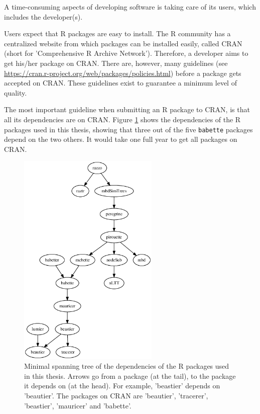 A time-consuming aspects of developing software is taking care of its
users, which includes the developer(s).

Users expect that R packages are easy to install.
The R community has a centralized website from which packages
can be installed easily, called CRAN (short for 'Comprehensive R Archive 
Network').
Therefore, a developer aims to get his/her package on CRAN.
There are, however, many 
guidelines (see \url{https://cran.r-project.org/web/packages/policies.html}) before 
a package gets accepted on CRAN.
These guidelines exist to guarantee a minimum level of quality.

The most important guideline when submitting an R package to CRAN,
is that all its dependencies are on CRAN. Figure \ref{fig:dependencies}
shows the dependencies of the R packages used in this thesis, showing that
three out of the five \verb;babette; packages depend on the two others. 
It would take one full year to get all packages on CRAN.

\begin{figure}[]
  \includegraphics[width=0.6\textwidth]{dependencies.png}
  \caption{
    Minimal spanning tree of the dependencies of the R packages used in this
    thesis. Arrows go from a package (at the tail), 
    to the package it depends on (at the head). For example,
    'beastier' depends on 'beautier'. The packages on CRAN are 'beautier',
    'tracerer', 'beastier', 'mauricer' and 'babette'.
  }
  \label{fig:dependencies}
\end{figure}

